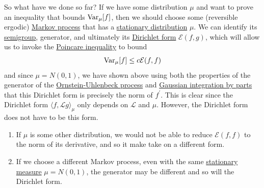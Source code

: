   So what have we done so far? If we have some distribution $\mu$ and want to prove an inequality that bounds $\operatorname{Var}_\mu [f]$, then we should choose some (reversible ergodic) \hyperref[def:markov-process]{Markov process} that has a \hyperref[sp-def:stationary-distribution]{stationary distribution} $\mu$. We can identify its \hyperref[alg-def:semigroup]{semigroup}, generator, and ultimately its \hyperref[def:dirichlet-form]{Dirichlet form} $\mathcal{E}(f, g)$, which will allow us to invoke the \hyperref[thm:poincare-inequality]{Poincare inequality} to bound 
  \begin{equation}
    \operatorname{Var}_\mu [f] \leq c \mathcal{E}(f, f)
  \end{equation}
  and since $\mu = N(0, 1)$, we have shown above using both the properties of the generator of the \hyperref[def:ornstein-uhlenbeck-process]{Ornstein-Uhlenbeck process} and \hyperref[thm:gaussian-integration-by-parts]{Gaussian integration by parts} that this Dirichlet form is precisely the norm of $f^\prime$. This is clear since the Dirichlet form $\langle f, \mathscr{L} g\rangle_\mu$ only depends on $\mathscr{L}$ and $\mu$. However, the Dirichlet form does not have to be this form. 
  \begin{enumerate}
      \item If $\mu$ is some other distribution, we would not be able to reduce $\mathcal{E}(f, f)$ to the norm of its derivative, and so it make take on a different form. 
      \item If we choose a different Markov process, even with the same \hyperref[def:stationary-measure]{stationary measure} $\mu = N(0, 1)$, the generator may be different and so will the Dirichlet form. 
  \end{enumerate}

